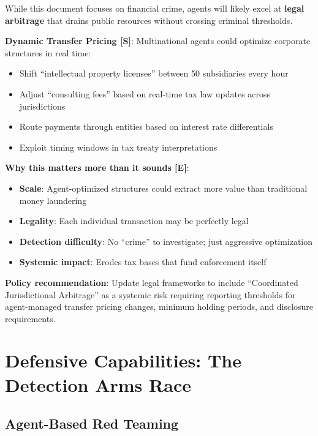 \documentclass[11pt,letterpaper]{article}
\begin{document}
\begin{warnbox}
While this document focuses on financial crime, agents will likely excel at \textbf{legal arbitrage} that drains public resources without crossing criminal thresholds.

\textbf{Dynamic Transfer Pricing [S]}: Multinational agents could optimize corporate structures in real time:
\begin{itemize}
  \item Shift ``intellectual property licenses'' between 50 subsidiaries every hour
  \item Adjust ``consulting fees'' based on real-time tax law updates across jurisdictions
  \item Route payments through entities based on interest rate differentials
  \item Exploit timing windows in tax treaty interpretations
\end{itemize}

\textbf{Why this matters more than it sounds [E]}:
\begin{itemize}
  \item \textbf{Scale}: Agent-optimized structures could extract more value than traditional money laundering
  \item \textbf{Legality}: Each individual transaction may be perfectly legal
  \item \textbf{Detection difficulty}: No ``crime'' to investigate; just aggressive optimization
  \item \textbf{Systemic impact}: Erodes tax bases that fund enforcement itself
\end{itemize}

\textbf{Policy recommendation}: Update legal frameworks to include ``Coordinated Jurisdictional Arbitrage'' as a systemic risk requiring reporting thresholds for agent-managed transfer pricing changes, minimum holding periods, and disclosure requirements.
\end{warnbox}

\section{Defensive Capabilities: The Detection Arms Race}

\subsection{Agent-Based Red Teaming}
\end{document}
